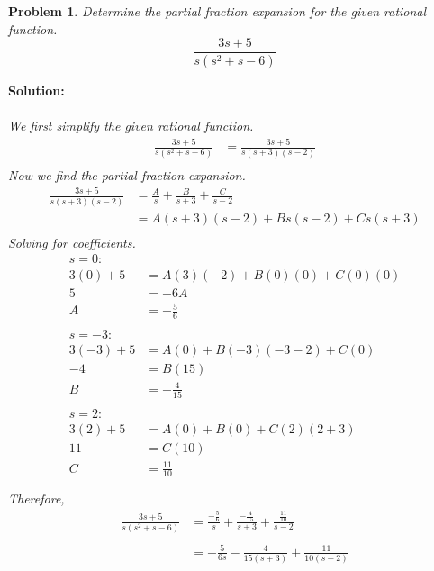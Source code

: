 \documentclass{article}
\newtheorem{problem}{Problem}
\begin{document}
    \newpage
    \begin{problem}
        Determine the partial fraction expansion for the given rational function. 
        \[
            \frac{3s + 5}{s(s^{2} + s - 6)}
        \]
    \end{problem}
    \textbf{Solution:} \\ \\
    \textit{We first simplify the given rational function.} \\
    \begin{align*}
     \frac{3s + 5}{s(s^{2} + s - 6)} &= \frac{3s + 5}{s(s + 3)(s - 2)} \\
    \end{align*}
    \textit{Now we find the partial fraction expansion.} \\
    \begin{align*}
        \frac{3s + 5}{s(s + 3)(s - 2)} &= \frac{A}{s} + \frac{B}{s + 3} + \frac{C}{s - 2} \\
        &= A(s + 3)(s - 2) + Bs(s - 2) + Cs(s + 3) \\
    \end{align*}
    \textit{Solving for coefficients.} \\
    \begin{align*}
        s = 0: \\
        3(0) + 5 &= A(3)(-2) + B(0)(0) + C(0)(0) \\
        5 &= -6A \\
        A &= -\frac{5}{6} \\ \\
        s = -3: \\
        3(-3) + 5 &= A(0) + B(-3)(-3 -2) + C(0) \\
        -4 &= B(15) \\
        B &= -\frac{4}{15} \\ \\
        s = 2: \\
        3(2) + 5 &= A(0) + B(0) + C(2)(2 + 3) \\
        11 &= C(10) \\
        C &= \frac{11}{10} \\ \\
    \end{align*}
    \textit{Therefore,} \\
    \begin{align*}
        \frac{3s + 5}{s(s^{2} + s - 6)} &= \frac{-\frac{5}{6}}{s} + \frac{-\frac{4}{15}}{s + 3} + \frac{\frac{11}{10}}{s - 2} \\ \\
        &= -\frac{5}{6s} - \frac{4}{15(s + 3)} + \frac{11}{10(s - 2)}
     \end{align*} 
    \newpage
\end{document}
